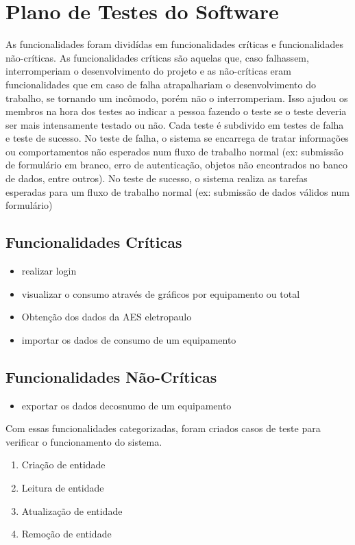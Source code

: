 \section{Plano de Testes do Software}
\label{Sec:6-software}

As funcionalidades foram dividídas em funcionalidades críticas e funcionalidades não-críticas. As funcionalidades críticas são aquelas que, caso falhassem, interromperiam o desenvolvimento do projeto e as não-críticas eram funcionalidades que em caso de falha atrapalhariam o desenvolvimento do trabalho, se tornando um incômodo, porém não o interromperiam. Isso ajudou os membros na hora dos testes ao indicar a pessoa fazendo o teste se o teste deveria ser mais intensamente testado ou não. Cada teste é subdivido em testes de falha e teste de sucesso. No teste de falha, o sistema se encarrega de tratar informações ou comportamentos não esperados num fluxo de trabalho normal (ex: submissão de formulário em branco, erro de autenticação, objetos não encontrados no banco de dados, entre outros). No teste de sucesso, o sistema realiza as tarefas esperadas para um fluxo de trabalho normal (ex: submissão de dados válidos num formulário)

\subsection{Funcionalidades Críticas}
\begin{itemize}
\item{realizar login}
\item{visualizar o consumo através de gráficos por equipamento ou total}
\item{Obtenção dos dados da AES eletropaulo}
\item{importar os dados de consumo de um equipamento}
\end{itemize}

\subsection{Funcionalidades Não-Críticas}
\begin{itemize}
\item{exportar os dados decosnumo de um equipamento}
\end{itemize}

Com essas funcionalidades categorizadas, foram criados casos de teste para verificar o funcionamento do sistema.

\begin{enumerate}
\item{
  Criação de entidade
}
\item{Leitura de entidade}
\item{Atualização de entidade}
\item{Remoção de entidade}

\end{enumerate}